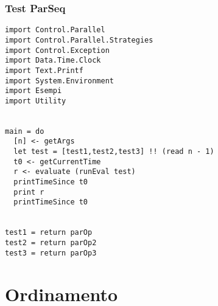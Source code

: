 \subsubsection{Test ParSeq}
\begin{verbatim}
import Control.Parallel
import Control.Parallel.Strategies
import Control.Exception
import Data.Time.Clock
import Text.Printf
import System.Environment
import Esempi
import Utility


main = do
  [n] <- getArgs
  let test = [test1,test2,test3] !! (read n - 1)
  t0 <- getCurrentTime
  r <- evaluate (runEval test)
  printTimeSince t0
  print r
  printTimeSince t0


test1 = return parOp
test2 = return parOp2
test3 = return parOp3
\end{verbatim}
\section{Ordinamento}
